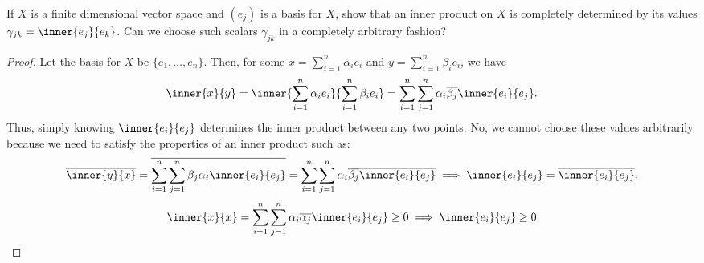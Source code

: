 \begin{question}
    If $X$ is a finite dimensional vector space and $(e_j)$ is a basis for $X$, show that an inner product on $X$ is completely determined by its values $\gamma_{jk} = \inner{e_j}{e_k}$. Can we choose such scalars $\gamma_{jk}$ in a completely arbitrary fashion?
    \label{section3.1-15}
\end{question}
\begin{proof}
    Let the basis for $X$ be $\{e_1 , \ldots , e_n\}$. Then, for some $x = \sum_{i=1}^n \alpha_i e_i$ and $y = \sum_{i=1}^n \beta_i e_i$, we have
    \[\inner{x}{y} = \inner{\sum_{i=1}^n \alpha_i e_i}{\sum_{i=1}^n \beta_i e_i} = \sum_{i=1}^n \sum_{j=1}^n \alpha_i \overline{\beta_j} \inner{e_i}{e_j}.\]
    Thus, simply knowing $\inner{e_i}{e_j}$ determines the inner product between any two points. No, we cannot choose these values arbitrarily because we need to satisfy the properties of an inner product such as:
    \[\overline{\inner{y}{x}} = \overline{\sum_{i=1}^n \sum_{j=1}^n \beta_j \overline{\alpha_i} \inner{e_i}{e_j}} = \sum_{i=1}^n \sum_{j=1}^n \alpha_i \overline{\beta_j}\overline{\inner{e_i}{e_j}} \implies \inner{e_i}{e_j} = \overline{\inner{e_i}{e_j}}.\]
    \[\inner{x}{x} = \sum_{i=1}^n \sum_{j=1}^n \alpha_i \overline{\alpha_j}\inner{e_i}{e_j} \geq 0 \implies \inner{e_i}{e_j} \geq 0\]
\end{proof}